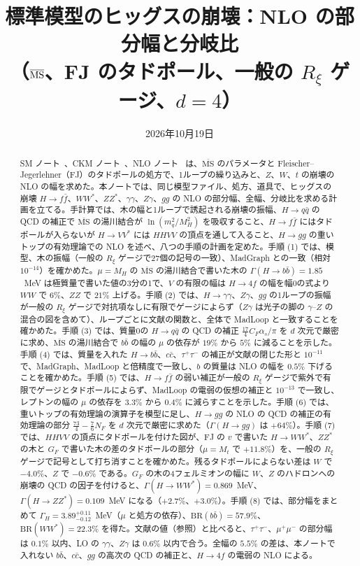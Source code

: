 \documentclass[a4paper,10pt]{ltjsarticle}
\title{標準模型のヒッグスの崩壊：NLO の部分幅と分岐比\\（$\MSbar$、FJ のタドポール、一般の $R_\xi$ ゲージ、$d=4$）}
\author{}
\date{2026年10月19日}
\newcommand{\MSbar}{\overline{\mathrm{MS}}}
\begin{document}
\maketitle

\begin{abstract}
SM ノート~\cite{smnote}、CKM ノート~\cite{ckmnote}、NLO ノート~\cite{nlonote} は、$\MSbar$ のパラメータと Fleischer--Jegerlehner（FJ）のタドポールの処方で、1ループの繰り込みと、$Z$、$W$、$t$ の崩壊の NLO の幅を求めた。本ノートでは、同じ模型ファイル、処方、道具で、ヒッグスの崩壊 $H\to f\bar f$、$WW^*$、$ZZ^*$、$\gamma\gamma$、$Z\gamma$、$gg$ の NLO の部分幅、全幅、分岐比を求める計画を立てる。手計算では、木の幅と1ループで誘起される崩壊の振幅、$H\to q\bar q$ の QCD の補正で $\MSbar$ の湯川結合が $\ln(m_q^2/M_H^2)$ を吸収すること、$H\to f\bar f$ にはタドポールが入らないが $H\to VV^*$ には $HHVV$ の頂点を通して入ること、$H\to gg$ の重いトップの有効理論での NLO を述べ、八つの手順の計画を定めた。手順 (1) では、模型、木の振幅（一般の $R_\xi$ ゲージで27個の記号の一致）、MadGraph との一致（相対 $10^{-14}$）を確かめた。$\mu=M_H$ の $\MSbar$ の湯川結合で書いた木の $\Gamma(H\to b\bar b)=1.85$~MeV は極質量で書いた値の3分の1で、$V$ の有限の幅は $H\to4f$ の幅を幅0の式より $WW$ で $6\%$、$ZZ$ で $21\%$ 上げる。手順 (2) では、$H\to\gamma\gamma$、$Z\gamma$、$gg$ の1ループの振幅が一般の $R_\xi$ ゲージで対抗項なしに有限でゲージによらず（$Z\gamma$ は光子の脚の $\gamma$--$Z$ の混合の図を含めて）、ループごとに文献の関数と、全体で MadLoop と一致することを確かめた。手順 (3) では、質量0の $H\to q\bar q$ の QCD の補正 $\frac{17}4C_F\alpha_s/\pi$ を $d$ 次元で厳密に求め、$\MSbar$ の湯川結合で $b\bar b$ の幅の $\mu$ の依存が $19\%$ から $5\%$ に減ることを示した。手順 (4) では、質量を入れた $H\to b\bar b$、$c\bar c$、$\tau^+\tau^-$ の補正が文献の閉じた形と $10^{-11}$ で、MadGraph、MadLoop と倍精度で一致し、$b$ の質量は NLO の幅を $0.5\%$ 下げることを確かめた。手順 (5) では、$H\to f\bar f$ の弱い補正が一般の $R_\xi$ ゲージで紫外で有限でゲージとタドポールによらず、MadLoop の電弱の仮想の補正と $10^{-13}$ で一致し、レプトンの幅の $\mu$ の依存を $3.3\%$ から $0.4\%$ に減らすことを示した。手順 (6) では、重いトップの有効理論の演算子を模型に足し、$H\to gg$ の NLO の QCD の補正の有効理論の部分 $\frac{73}4-\frac76N_F$ を $d$ 次元で厳密に求めた（$\Gamma(H\to gg)$ は $+64\%$）。手順 (7) では、$HHVV$ の頂点にタドポールを付けた図が、FJ の $v$ で書いた $H\to WW^*$、$ZZ^*$ の木と $G_F$ で書いた木の差のタドポールの部分（$\mu=M_t$ で $+11.8\%$）を、一般の $R_\xi$ ゲージで記号として打ち消すことを確かめた。残るタドポールによらない差は $W$ で $-4.0\%$、$Z$ で $-0.6\%$ である。$G_F$ の木の4フェルミオンの幅に $W$、$Z$ のハドロンへの崩壊の QCD の因子を付けると、$\Gamma(H\to WW^*)=0.869$~MeV、$\Gamma(H\to ZZ^*)=0.109$~MeV になる（$+2.7\%$、$+3.0\%$）。手順 (8) では、部分幅をまとめて $\Gamma_H=3.89^{+0.11}_{-0.12}$~MeV（$\mu$ と処方の依存）、$\mathrm{BR}(b\bar b)=57.9\%$、$\mathrm{BR}(WW^*)=22.3\%$ を得た。文献の値（参照）と比べると、$\tau^+\tau^-$、$\mu^+\mu^-$ の部分幅は $0.1\%$ 以内、LO の $\gamma\gamma$、$Z\gamma$ は $0.6\%$ 以内で合う。全幅の $5.5\%$ の差は、本ノートで入れない $b\bar b$、$c\bar c$、$gg$ の高次の QCD の補正と、$H\to4f$ の電弱の NLO による。
\end{abstract}
\end{document}
